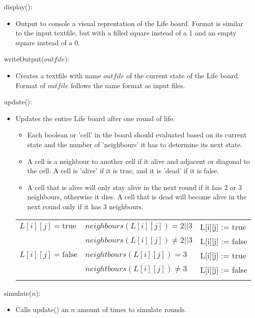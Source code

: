 \documentclass[12pt]{article}
\begin{document}
\noindent display():
\begin{itemize} 
\item Output to console a visual reprentation of the Life board. Format is similar to the input textfile, but with a filled square instead of a 1 and an empty square instead of a 0.

\end{itemize}


\noindent writeOutput($outfile$):
\begin{itemize}
\item Creates a textfile with name $outfile$ of the current state of the Life board. Format of $outfile$ follows the same format as input files.

\end{itemize}

\noindent update():
\begin{itemize}
\item Updates the entire Life board after one round of life. 
\begin{itemize}
	\item Each boolean or 'cell' in the board should evaluated based on its current state and the number of 'neighbours' it has to determine its next state. 
	\item A cell is a neighbour to another cell if it alive and adjacent or diagonal to the cell. A cell is 'alive' if it is true, and it is 'dead' if it is false. 
	\item A cell that is alive will only stay alive in the next round if it has 2 or 3 neighbours, otherwise it dies. A cell that is dead will become alive in the next round only if it has 3 neighbours.  
\end{itemize}

\begin{tabular}{|p{2.5cm}|p{5cm}|l|}
\hhline{|-|-|-|}
$L[i][j] = \mbox{true}$ & $neighbours(L[i][j]) = 2 || 3$ & L[i][j] := true \\
\hhline{|~|-|-|}
& $neighbours(L[i][j]) \neq 2 || 3 $ & L[i][j] := false  \\
\hhline{|~|-|-|}
$L[i][j] = \mbox{false}$ & $neightbours(L[i][j]) = 3$ & L[i][j] := true \\
\hhline{|~|-|-|}
& $neightbours(L[i][j]) \neq 3$ & L[i][j] := false  \\
\hhline{|~|-|-|}
\end{tabular}

\end{itemize}

\noindent simulate($n$):
\begin{itemize}
\item Calls update() an $n$ amount of times to simulate rounds. 

\end{itemize}
\end{document}
